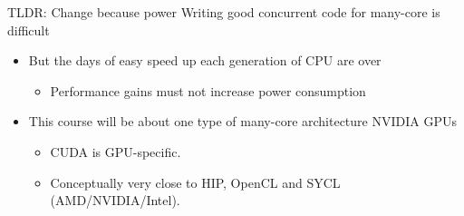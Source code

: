 \documentclass[aspectratio=43]{beamer}
\begin{document}
\begin{frame}[fragile]{TLDR: Change because power}
    Writing good concurrent code for many-core is difficult
    \begin{itemize}
        \item But the days of easy speed up each generation of CPU are over
        \begin{itemize}
            \item Performance gains must not increase power consumption
        \end{itemize}
        \item This course will be about one type of many-core architecture NVIDIA GPUs
        \begin{itemize}
            \item CUDA is GPU-specific.
            \item Conceptually very close to HIP, OpenCL and SYCL (AMD/NVIDIA/Intel).
        \end{itemize}
    \end{itemize}
\end{frame}
\end{document}
